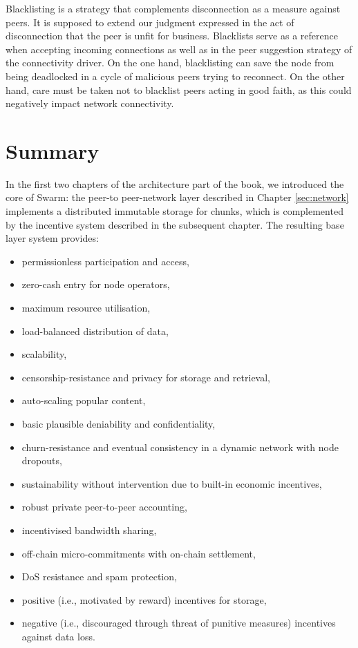 Blacklisting is a strategy that complements disconnection as a measure against peers. It is supposed to extend our judgment expressed in the act of disconnection that the peer is unfit for business.
Blacklists serve as a reference when accepting incoming connections as well as in the peer suggestion strategy of the connectivity driver. On the one hand, blacklisting can save the node from being deadlocked in a cycle of malicious peers trying to reconnect. On the other hand, care must be taken not to blacklist peers acting in good faith, as this could negatively impact network connectivity.





\section{Summary}


In the first two chapters of the architecture part of the book, we introduced the core of Swarm: the peer-to peer-network layer described in Chapter \ref{sec:network} implements a distributed immutable storage for chunks, which is complemented by the incentive system described in the subsequent chapter. The resulting base layer system provides:

\begin{itemize}
    \item permissionless participation and access,
    \item zero-cash entry for node operators,
    \item maximum resource utilisation, 
    \item load-balanced distribution of data,
    \item scalability, 
    \item censorship-resistance and privacy for storage and retrieval,
    \item auto-scaling popular content,
    \item basic plausible deniability and confidentiality,
    \item churn-resistance and eventual consistency in a dynamic network with node dropouts,
    \item sustainability without intervention due to built-in economic incentives,
    \item robust private peer-to-peer accounting, 
    \item incentivised bandwidth sharing,
    \item off-chain micro-commitments with on-chain settlement,
    \item DoS resistance and spam protection,
    \item positive (i.e., motivated by reward) incentives for storage,
    \item negative (i.e., discouraged through threat of punitive measures) incentives against data loss.
\end{itemize}


